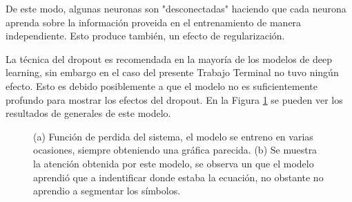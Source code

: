 De este modo, algunas neuronas \cite{harvard} son "desconectadas" haciendo que cada neurona aprenda sobre la información proveida en el entrenamiento de manera independiente. Esto produce también, un efecto de regularización.

La técnica del dropout es recomendada en la mayoría de los modelos de deep learning, sin embargo en el caso del presente Trabajo Terminal no tuvo ningún efecto. Esto es debido posiblemente a que el modelo no es suficientemente profundo para mostrar los efectos del dropout. En la Figura \ref{fig:dropout-bad} se pueden ver los resultados de generales de este modelo.



\begin{figure}[H]
    \centering
    \caption{(a) Función de perdida del sistema, el modelo se entreno en varias ocasiones, siempre obteniendo una gráfica parecida. (b) Se muestra la atención obtenida por este modelo, se observa un que el modelo aprendió que a indentificar donde estaba la ecuación, no obstante no aprendio a segmentar los símbolos.}
    \label{fig:dropout-bad}
\end{figure}

 







